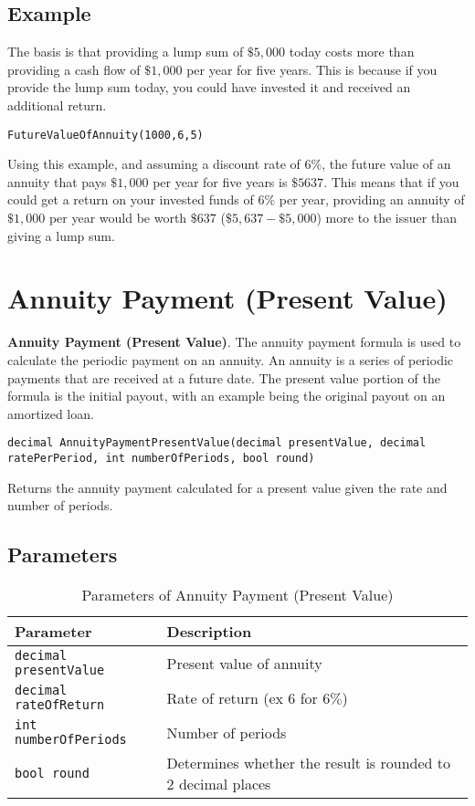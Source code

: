 \subsection{Example}
The basis is that providing a lump sum of $\$5,000$ today costs more than providing a cash flow of $\$1,000$ per year for five years. This is because if you provide the lump sum today, you could have invested it and received an additional return.
\begin{lstlisting}
FutureValueOfAnnuity(1000,6,5)
\end{lstlisting}
Using this example, and assuming a discount rate of $6\%$, the future value of an annuity that pays $\$1,000$ per year for five years is $\$5637$. This means that if you could get a return on your invested funds of $6\%$ per year, providing an annuity of $\$1,000$ per year would be worth $\$637$ ($\$5,637-\$5,000$) more to the issuer than giving a lump sum.






\section{Annuity Payment (Present Value)}
\textbf{Annuity Payment (Present Value)}. The annuity payment formula is used to calculate the periodic payment on an annuity. An annuity is a series of periodic payments that are received at a future date. The present value portion of the formula is the initial payout, with an example being the original payout on an amortized loan.
\begin{lstlisting}
decimal AnnuityPaymentPresentValue(decimal presentValue, decimal ratePerPeriod, int numberOfPeriods, bool round)
\end{lstlisting}
Returns the annuity payment calculated for a present value given the rate and number of periods.

\subsection{Parameters}
\begin{table}[h]
\begin{tabular}{|l|l|}
\hline
\textbf{Parameter} & \textbf{Description}\\
\hline
\verb|decimal presentValue| & Present value of annuity\\
\verb|decimal rateOfReturn| & Rate of return (ex $6$ for $6\%$)\\
\verb|int numberOfPeriods| & Number of periods\\
\verb|bool round| & Determines whether the result is rounded to $2$ decimal places\\
\hline
\end{tabular}
\caption{Parameters of Annuity Payment (Present Value)}
\end{table}


